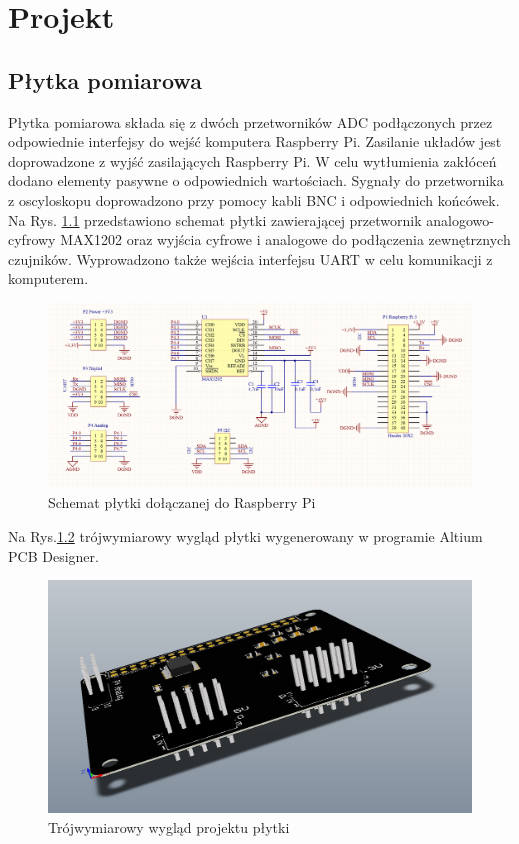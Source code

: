 \chapter{Projekt}
\label{ch:projekt}

\section{Płytka pomiarowa}

Płytka pomiarowa składa się z dwóch przetworników ADC podłączonych przez odpowiednie interfejsy do wejść komputera Raspberry Pi. Zasilanie układów jest doprowadzone z wyjść zasilających Raspberry Pi. W celu wytłumienia zakłóceń dodano elementy pasywne o odpowiednich wartościach. Sygnały do przetwornika z oscyloskopu doprowadzono przy pomocy kabli BNC i odpowiednich końcówek.
Na Rys. \ref{fig:schplytki} przedstawiono schemat płytki zawierającej przetwornik analogowo-cyfrowy MAX1202 oraz wyjścia cyfrowe i analogowe do podłączenia zewnętrznych czujników. Wyprowadzono także wejścia interfejsu UART w celu komunikacji z komputerem.


\begin{figure}[h]
	\centering
		\includegraphics[width=14cm]{schplytki}
	\caption{Schemat płytki dołączanej do Raspberry Pi} 
	\label{fig:schplytki}
\end{figure}

Na Rys.\ref{fig:plytka3d} trójwymiarowy wygląd płytki wygenerowany w programie Altium PCB Designer. 

\begin{figure}[h]
	\centering
		\includegraphics[width=14cm]{plytka3d}
	\caption{Trójwymiarowy wygląd projektu płytki} 
	\label{fig:plytka3d}
\end{figure}

